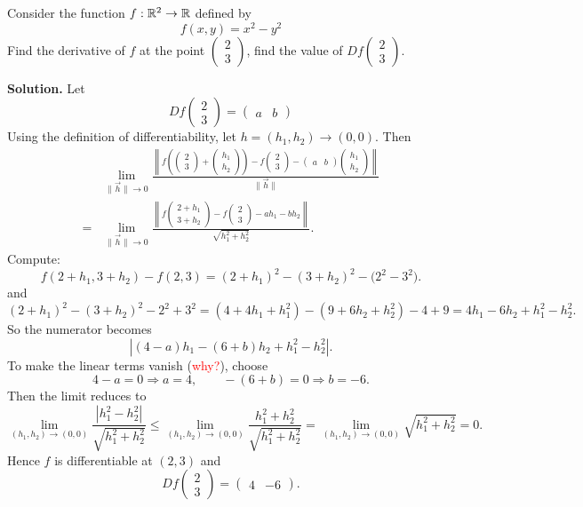 \begin{example}
Consider the function $f:\mathbb{R}^2 \to \mathbb{R}$ defined by
$$
f(x,y) = x^2-y^2
$$
Find the derivative of $f$ at the point $\begin{pmatrix}
2 \\ 3
\end{pmatrix}$, find the value of $Df\begin{pmatrix}
2 \\ 3
\end{pmatrix}$.
\end{example}
\textbf{Solution.} Let $$Df\begin{pmatrix}2 \\ 3
\end{pmatrix}=\begin{pmatrix}
  a & b
\end{pmatrix}$$
Using the definition of differentiability, let $h=(h_1,h_2)\to(0,0)$. Then
\begin{align*}
&\lim_{\|\vec h\|\to 0}\frac{\left\|f\left(\begin{pmatrix}
2\\3
\end{pmatrix}+\begin{pmatrix}h_1\\h_2\end{pmatrix}\right)-f\begin{pmatrix}2\\3\end{pmatrix}-\begin{pmatrix}a&b\end{pmatrix}\begin{pmatrix}h_1\\h_2\end{pmatrix}\right\|}{\|\vec h\|}\\
=&
\lim_{\|\vec h\|\to 0}
\frac{\left\|f\begin{pmatrix}2+h_1\\3+h_2\end{pmatrix}-f\begin{pmatrix}2\\3\end{pmatrix}-a h_1-b h_2\right\|}{\sqrt{h_1^2+h_2^2}}.  
\end{align*}
Compute:
\[
f(2+h_1,3+h_2)-f(2,3)
=(2+h_1)^2-(3+h_2)^2-\bigl(2^2-3^2\bigr).
\]
and
\[
(2+h_1)^2-(3+h_2)^2-2^2+3^2
= (4+4h_1+h_1^2)-(9+6h_2+h_2^2)-4+9
=4h_1-6h_2+h_1^2-h_2^2.
\]
So the numerator becomes
\[
\left|(4-a)h_1-(6+b)h_2+h_1^2-h_2^2\right|.
\]
To make the linear terms vanish (\textcolor{red}{why?}), choose
\[
4-a=0\Rightarrow a=4,\qquad -(6+b)=0\Rightarrow b=-6.
\]
Then the limit reduces to
\[
\lim_{(h_1,h_2)\to(0,0)}\frac{|h_1^2-h_2^2|}{\sqrt{h_1^2+h_2^2}}
\le
\lim_{(h_1,h_2)\to(0,0)}\frac{h_1^2+h_2^2}{\sqrt{h_1^2+h_2^2}}
=
\lim_{(h_1,h_2)\to(0,0)}\sqrt{h_1^2+h_2^2}=0.
\]
Hence $f$ is differentiable at $(2,3)$ and
\[
Df\begin{pmatrix}2\\3\end{pmatrix}=\begin{pmatrix}4&-6\end{pmatrix}.
\]

